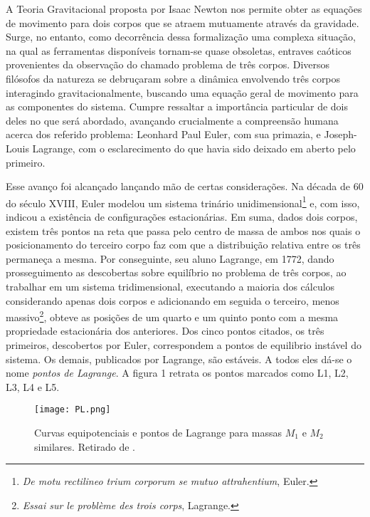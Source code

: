 A Teoria Gravitacional proposta por Isaac Newton nos permite obter as equações de movimento para  dois corpos que se atraem mutuamente através da gravidade. Surge, no entanto, como decorrência dessa formalização uma complexa situação, na qual as ferramentas disponíveis tornam-se quase obsoletas, entraves caóticos provenientes da observação do chamado problema de três corpos. Diversos filósofos da natureza se debruçaram sobre a dinâmica envolvendo três corpos interagindo gravitacionalmente, buscando uma equação geral de movimento para as componentes do sistema. Cumpre ressaltar a importância particular de dois deles no que será abordado, avançando crucialmente a compreensão humana acerca dos referido problema: Leonhard Paul Euler, com sua primazia, e Joseph-Louis Lagrange, com o esclarecimento do que havia sido deixado em aberto pelo primeiro.
   
Esse avanço foi alcançado lançando mão de certas considerações. Na década de 60 do século XVIII, Euler modelou um sistema trinário unidimensional\footnote{\emph{De motu rectilineo trium corporum se mutuo attrahentium}, Euler.} e, com isso, indicou a existência de configurações estacionárias. Em suma, dados dois corpos, existem três pontos na reta que passa pelo centro de massa de ambos nos quais o posicionamento do terceiro corpo faz com que a distribuição relativa entre os três permaneça a mesma. Por conseguinte, seu aluno Lagrange, em 1772, dando prosseguimento as descobertas sobre equilíbrio no problema de três corpos, ao trabalhar em um sistema tridimensional, executando a maioria dos cálculos considerando apenas dois corpos e adicionando em seguida o terceiro, menos massivo\footnote{\emph{Essai sur le problème des trois corps}, Lagrange.}, obteve as posições de um quarto e um quinto ponto com a mesma propriedade estacionária dos anteriores. Dos cinco pontos citados, os três primeiros, descobertos por Euler, correspondem a pontos de equilibrio instável do sistema. Os demais, publicados por Lagrange, são estáveis. A todos eles dá-se o nome \textit{pontos de Lagrange}. A figura 1 retrata os pontos marcados como L1, L2, L3, L4 e L5.

\begin{figure}[!h]
\centering
\texttt{[image: PL.png]}
\caption{Curvas equipotenciais e pontos de Lagrange para massas $M_1$ e $M_2$ similares. Retirado de \cite[figura 23.68, p. 526]{ksouza}.}
\end{figure}
   
